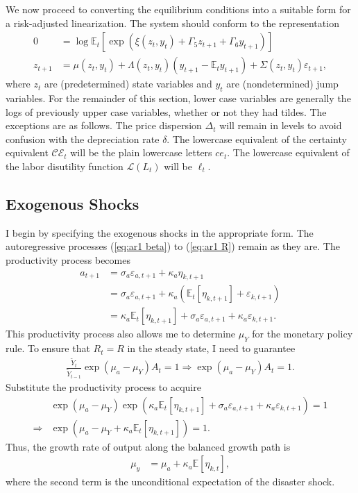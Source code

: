 \documentclass[12 pt, oneside]{article}
\theoremstyle{definition}
\theoremstyle{definition}
\theoremstyle{definition}
\newcommand{\E}{\mathbb{E}}
\newcommand{\calC}{\mathcal{C}}
\newcommand{\calE}{\mathcal{E}}
\newcommand{\calL}{\mathcal{L}}
\newcommand{\RA}{\Rightarrow}
\begin{document}
We now proceed to converting the equilibrium conditions into a suitable form for a risk-adjusted linearization. The system should conform to the representation
\begin{align*}
  0 & = \log \E_t\left[\exp\left(\xi(z_t, y_t) + \Gamma_5 z_{t + 1} + \Gamma_6 y_{t + 1}\right)\right]\\
  z_{t + 1} & = \mu(z_t, y_t) + \Lambda(z_t, y_t) (y_{t + 1} - \E_t y_{t + 1}) + \Sigma(z_t, y_t) \varepsilon_{t + 1},
\end{align*}
where $z_t$ are (predetermined) state variables and $y_t$ are (nondetermined) jump variables.
For the remainder of this section, lower case variables are generally the logs of previously upper case variables, whether or not they had tildes. The exceptions are as follows. The price dispersion $\Delta_t$ will remain in levels to avoid confusion with the depreciation rate $\delta$. The lowercase equivalent of the certainty equivalent $\calC\calE_t$ will be the plain lowercase letters $ce_t$. The lowercase equivalent of the labor disutility function $\calL(L_t)$ will be $\ell_t$.

\subsection{Exogenous Shocks}
I begin by specifying the exogenous shocks in the appropriate form.
The autoregressive processes (\ref{eq:ar1 beta}) to (\ref{eq:ar1 R}) remain as they are. The productivity process becomes
\begin{align*}
  a_{t + 1} & = \sigma_a \varepsilon_{a, t + 1} + \kappa_a \eta_{k, t + 1}\\
            & = \sigma_a\varepsilon_{a, t + 1} + \kappa_a (\E_t[\eta_{k, t + 1}] + \varepsilon_{k, t + 1})\\
            & = \kappa_a\E_t[\eta_{k, t + 1}] + \sigma_a\varepsilon_{a, t + 1} + \kappa_a \varepsilon_{k, t + 1}.
\end{align*}
This productivity process also allows me to determine $\mu_Y$ for the monetary policy rule. To ensure that $R_t = R$ in the steady state, I need to guarantee
\begin{align*}
\frac{\tilde{Y}_t}{\tilde{Y}_{t - 1}} \exp(\mu_a - \mu_Y) A_t = 1 \RA \exp(\mu_a - \mu_Y) A_t = 1.
\end{align*}
Substitute the productivity process to acquire
\begin{align*}
 & \exp(\mu_a - \mu_Y) \exp(\kappa_a\E_t[\eta_{k, t + 1}] + \sigma_a\varepsilon_{a, t + 1} + \kappa_a \varepsilon_{k, t + 1}) = 1 \\
\RA & \exp(\mu_a - \mu_Y + \kappa_a \E_t[\eta_{k, t + 1}]) = 1.
\end{align*}
Thus, the growth rate of output along the balanced growth path is
\begin{align*}
  \mu_y & = \mu_a + \kappa_a \E[\eta_{k, t}],
\end{align*}
where the second term is the unconditional expectation of the
disaster shock.
\end{document}
